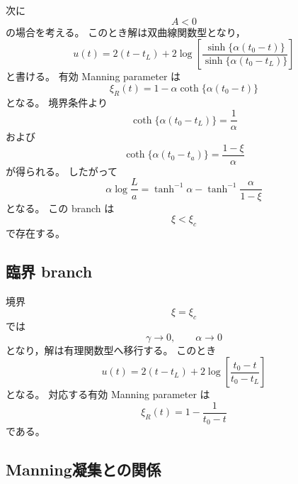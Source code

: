 \documentclass[11pt,a4paper]{ltjsarticle}
\theoremstyle{definition}
\theoremstyle{remark}
\begin{document}
次に
\begin{equation}
A<0
\end{equation}
の場合を考える。
このとき解は双曲線関数型となり，
\begin{equation}
u(t)
=
2(t-t_L)
+
2\log
\left[
\frac{
\sinh\{\alpha(t_0-t)\}
}{
\sinh\{\alpha(t_0-t_L)\}
}
\right]
\label{hyperbolic_solution}
\end{equation}
と書ける。
有効 Manning parameter は
\begin{equation}
\xi_R(t)
=
1-\alpha\coth\{\alpha(t_0-t)\}
\label{xiR_hyper}
\end{equation}
となる。
境界条件より
\begin{equation}
\coth\{\alpha(t_0-t_L)\}
=\frac1\alpha
\label{boundary_hyper_1}
\end{equation}
および
\begin{equation}
\coth\{\alpha(t_0-t_a)\}
=\frac{1-\xi}{\alpha}
\label{boundary_hyper_2}
\end{equation}
が得られる。
したがって
\begin{equation}
\alpha \log\frac{L}{a}
=
\tanh^{-1}\alpha
-
\tanh^{-1}\frac{\alpha}{1-\xi}
\label{alpha_equation}
\end{equation}
となる。
この branch は
\begin{equation}
\xi<\xi_c
\end{equation}
で存在する。


\subsection{臨界 branch}

境界
\begin{equation}
\xi=\xi_c
\end{equation}
では
\begin{equation}
\gamma\to0,
\qquad
\alpha\to0
\end{equation}
となり，解は有理関数型へ移行する。
このとき
\begin{equation}
u(t)
=
2(t-t_L)
+
2\log
\left[
\frac{t_0-t}{t_0-t_L}
\right]
\label{critical_solution}
\end{equation}
となる。
対応する有効 Manning parameter は
\begin{equation}
\xi_R(t)
=
1-\frac1{t_0-t}
\label{critical_xiR}
\end{equation}
である。


\subsection{Manning凝集との関係}
\end{document}
